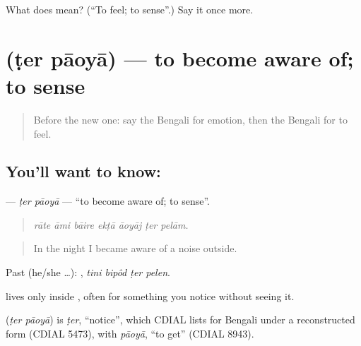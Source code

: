 \begin{tcolorbox}[breakable,colback=teal!4,colframe=teal!35!black,title={Before you move on}]
What does   mean? (\textquotedblleft{}To feel; to sense\textquotedblright{}.) Say it once more.
\end{tcolorbox}
\section[\texorpdfstring{\bn{টের} \bn{পাওয়া} (ṭer pāoyā)}{টের পাওয়া (ṭer pāoyā)}]{  (ṭer pāoyā) — to become aware of; to sense}

\label{lesson:BN-C438-ter-paoya}



\begin{quote}
Before the new one: say the Bengali for emotion, then the Bengali for to feel.
\end{quote}

\subsection*{You'll want to know:  }
\textbf{ } — \emph{ṭer pāoyā} — \textquotedblleft{}to become aware of; to sense\textquotedblright{}.

\begin{quote}
      
\end{quote}

\begin{quote}
\emph{rāte āmi bāire ekṭā āoyāj ṭer pelām.}
\end{quote}

\begin{quote}
In the night I became aware of a noise outside.
\end{quote}

Past (he/she …):    , \emph{tini bipôd ṭer pelen}.

 lives only inside  , often for something you notice without seeing it.

\begin{cousinweb}
\textbf{ } (\emph{ṭer pāoyā}) is \emph{ṭer}, \textquotedblleft{}notice\textquotedblright{}, which CDIAL lists for Bengali under a reconstructed form (CDIAL 5473), with \emph{pāoyā}, \textquotedblleft{}to get\textquotedblright{} (CDIAL 8943).
\end{cousinweb}

